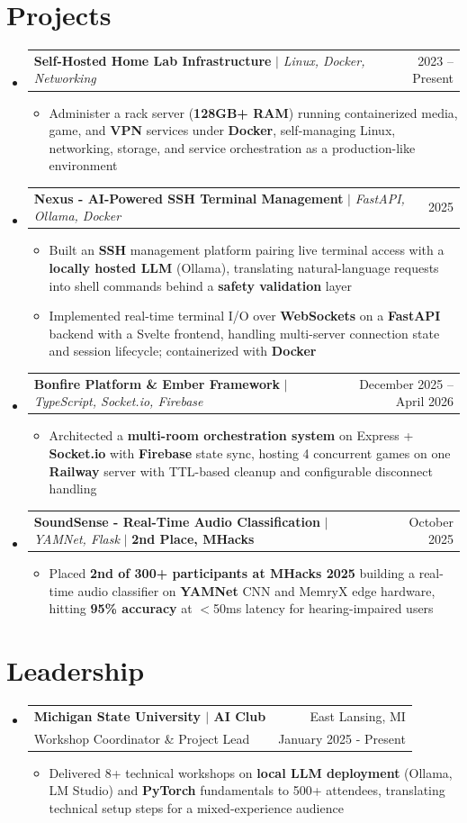 \documentclass[letterpaper,11pt]{article}
\makeatletter
\newcommand{\resumeItem}[1]{
  \item\small{
    {#1 \vspace{-2pt}}
  }
}
\newcommand{\resumeSubheading}[4]{
  \vspace{-2pt}\item
    \begin{tabular*}{0.97\textwidth}[t]{l@{\extracolsep{\fill}}r}
      \textbf{#1} & \small #2 \\
      \small#3 & \small #4 \\
    \end{tabular*}\vspace{-7pt}
}
\newcommand{\resumeProjectHeading}[2]{
    \item
    \begin{tabular*}{0.97\textwidth}{l@{\extracolsep{\fill}}r}
      \small#1 & #2 \\
    \end{tabular*}\vspace{-7pt}
}
\newcommand{\resumeSubHeadingListStart}{\begin{itemize}[leftmargin=0.15in, label={}]}
\newcommand{\resumeSubHeadingListEnd}{\end{itemize}}
\newcommand{\resumeItemListStart}{\begin{itemize}}
\newcommand{\resumeItemListEnd}{\end{itemize}\vspace{-5pt}}
\makeatother
\begin{document}
\section{Projects}
    \resumeSubHeadingListStart
      \resumeProjectHeading
          {\textbf{Self-Hosted Home Lab Infrastructure} $|$ \emph{Linux, Docker, Networking}}{2023 -- Present}
          \resumeItemListStart
            \resumeItem{Administer a rack server (\textbf{128GB+ RAM}) running containerized media, game, and \textbf{VPN} services under \textbf{Docker}, self-managing Linux, networking, storage, and service orchestration as a production-like environment}
          \resumeItemListEnd
      \resumeProjectHeading
          {\textbf{Nexus - AI-Powered SSH Terminal Management} $|$ \emph{FastAPI, Ollama, Docker}}{2025}
          \resumeItemListStart
            \resumeItem{Built an \textbf{SSH} management platform pairing live terminal access with a \textbf{locally hosted LLM} (Ollama), translating natural-language requests into shell commands behind a \textbf{safety validation} layer}
            \resumeItem{Implemented real-time terminal I/O over \textbf{WebSockets} on a \textbf{FastAPI} backend with a Svelte frontend, handling multi-server connection state and session lifecycle; containerized with \textbf{Docker}}
          \resumeItemListEnd
      \resumeProjectHeading
          {\textbf{Bonfire Platform \& Ember Framework} $|$ \emph{TypeScript, Socket.io, Firebase}}{December 2025 -- April 2026}
          \resumeItemListStart
            \resumeItem{Architected a \textbf{multi-room orchestration system} on Express + \textbf{Socket.io} with \textbf{Firebase} state sync, hosting 4 concurrent games on one \textbf{Railway} server with TTL-based cleanup and configurable disconnect handling}
          \resumeItemListEnd
      \resumeProjectHeading
          {\textbf{SoundSense - Real-Time Audio Classification} $|$ \emph{YAMNet, Flask} $|$ \textbf{2nd Place, MHacks}}{October 2025}
          \resumeItemListStart
            \resumeItem{Placed \textbf{2nd of 300+ participants at MHacks 2025} building a real-time audio classifier on \textbf{YAMNet} CNN and MemryX edge hardware, hitting \textbf{95\% accuracy} at $<$50ms latency for hearing-impaired users}
          \resumeItemListEnd
    \resumeSubHeadingListEnd

\section{Leadership}
  \resumeSubHeadingListStart
    \resumeSubheading
      {Michigan State University $|$ AI Club}{East Lansing, MI}
      {Workshop Coordinator \& Project Lead}{January 2025 - Present}
      \resumeItemListStart
        \resumeItem{Delivered 8+ technical workshops on \textbf{local LLM deployment} (Ollama, LM Studio) and \textbf{PyTorch} fundamentals to 500+ attendees, translating technical setup steps for a mixed-experience audience}
      \resumeItemListEnd
  \resumeSubHeadingListEnd
\end{document}
